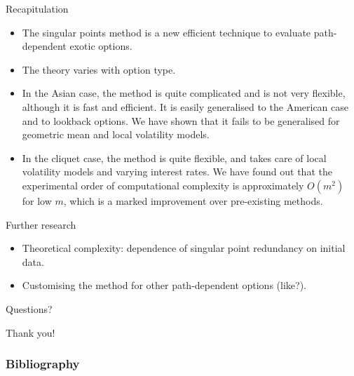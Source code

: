 \documentclass[utf8,t,compress,xcolor=svgnames,handout]{beamer}
\begin{document}
	\begin{frame}{Recapitulation}
		\begin{itemize}
			\item The singular points method is a new efficient technique to evaluate path-dependent exotic options.
			\item The theory varies with option type.
			\item In the Asian case, the method is quite complicated and is not very flexible, although it is fast and efficient. It is easily generalised to the American case and to lookback options. \alert{We have shown that it fails to be generalised for geometric mean and local volatility models.}
			\item In the cliquet case, the method is quite flexible, and takes care of local volatility models and varying interest rates. \alert{We have found out that the experimental order of computational complexity is approximately $ O(m^2) $ for low $ m $}, which is a marked improvement over pre-existing methods.
		\end{itemize}
	\end{frame}
	
	
	\begin{frame}{Further research}
		\begin{itemize}
			\item Theoretical complexity: dependence of singular point redundancy on initial data.
			\item Customising the method for other path-dependent options (like?).
		\end{itemize}
	\end{frame}
	
	
	\begin{frame}[plain,c]
		
		\begin{center}
			{\Huge Questions?}
		\end{center}
		
		\vfill
		
		\begin{center}
			{\Huge Thank you!}
		\end{center}
		
	\end{frame}
	
	
	\appendix
	
	\begin{frame}[allowframebreaks]
		\frametitle<presentation>{Bibliography}
		\printbibliography
	\end{frame}
	
	
\end{document}

